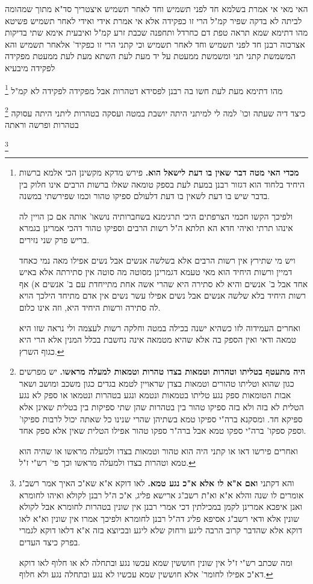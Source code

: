 \documentclass[12pt, openany]{book}
\newcommand{\footnotecomment}[1]{
	\renewcommand\thefootnote{}
	\footnote{#1}}
\newcommand{\commenta}[1]{\footnotecomment{#1}}
\begin{document}
{האי מאי אי אמרת בשלמא חד לפני תשמיש וחד לאחר תשמיש איצטריך סד"א מתוך שמהומה לביתה לא בדקה שפיר קמ"ל הרי זו כפקידה אלא אי אמרת אידי ואידי לאחר תשמיש פשיטא 
מהו דתימא שמא תראה טפת דם כחרדל ותחפנה שכבת זרע קמ"ל 
ואיבעית אימא שתי בדיקות אצרכוה רבנן חד לפני תשמיש וחד לאחר תשמיש וכי קתני הרי זו כפקיד' אלאחר תשמיש והא המשמשת קתני תני ומשמשת
ממעטת על יד מעת לעת השתא מעת לעת ממעטת
מפקידה לפקידה מיבעיא 
\commenta{\textbf{מכדי האי מטה דבר שאין בו דעת לישאל הוא.} פירש מדקא מקשינן הכי אלמא ברשות היחיד בלחוד הוא דגזור רבנן במעת לעת בספק טומאה שאלו ברשות הרבים אינו חלוק בין בדבר שיש בו דעת לשאין בו דעת דלעולם ספיקו טהור וכמו שפירשתי במשנה.\par ולפיכך הקשו חכמי הצרפתים היכי תרגימנא בשחברותיה נושאו' אותה אם כן הויין לה אינהו תרתי ואיהי חדא הא תלתא ה"ל רשות הרבים וספיקו טהור דהכי אמרינן בגמרא בריש פרק שני נזירים.\par ויש מי שתירץ אין רשות הרבים אלא בשלשה אנשים אבל נשים אפילו מאה נמי כאחד דמיין ורשות היחיד הוא מאי טעמא דגמרינן מסוטה מה סוטה אין סתירתה אלא באיש אחד אבל ב' אנשים והיא לא סתירה היא שהרי אשה אחת מתייחדת עם ב' אנשים א) אף רשות היחיד בלא שלשה אנשים אבל נשים אפילו עשר נשים אין אדם מתיחד הילכך הויא לה סתירה ורשות היחיד היא, וזה אינו כלום.\par ואחרים העמידוה לזו כשהיא ישנה בכילה במטה וחלקה רשות לעצמה ולי נראה שזו היא טמאה ודאי ואין הספק בה אלא שהיא מטמאה אינה נחשבת בכלל המנין אלא הרי היא כגוף השרץ. }
מהו דתימא מעת לעת חשו בה רבנן לפסידא דטהרות אבל מפקידה לפקידה לא קמ"ל
\commenta{\textbf{היה מתעטף בטליתו וטהרות וטמאות בצדו טהרות וטמאות למעלה מראשו.} יש מפרשים כגון שהוא וטליתו טהורים וטמאות בצדן שראויין לטמא בגדים כגון משכב ומושב ושאר אבות הטומאות ספק נגע טליתו בטמאות ונטמא ונגע בטהרות ונטמאו או ספק לא נגע הטלית לא בזה ולא בזה ספיקו טהור בין בטהרות שהן שתי ספיקות בין בטלית שאינן אלא ספיקא חד. ומסקנא ברה"י ספיקו טמא בשתיהן שהרי שנינו כל שאתה יכול לרבות ספיקו' וספק ספקו' ברה"י ספקו טמא אבל ברה"ר ספקו טהור אפילו הטלית שאין אלא ספק אחד.\par ואחרים פירשו דאו או קתני היה הוא טהור וטמאות בצדו ולמעלה מראשו או שהיה הוא טמא וטהרות בצדו ולמעלה מראשו וכך פי' רש"י ז"ל. }
כיצד דיה שעתה וכו' למה לי למיתני היתה יושבת במטה ועסקה בטהרות ליתני היתה עסוקה בטהרות ופרשה וראתה 
\commenta{והא דקתני \textbf{ואם א"א לו אלא א"כ נגע טמא.} לאו דוקא א"א שא"כ האיך אמר רשב"ג אומרים לו שנה והלא א"א וא"ת רשב"ג ארישא פליג, א"כ ה"ל רבנן לקולא ואיהו לחומרא ואנן איפכא אמרינן לקמן במכילתין דכי אמרי רבנן אין שונין בטהרות לחומרא אבל לקולא שונין אלא ודאי רשב"ג אסיפא פליג דה"ל רבנן לחומרא ולפיכך אמרו אין שונין וא"א לאו דוקא אלא שהדבר קרוב הרבה ליגע ורחוק שלא ליגע ובכיוצא בזה א"א דלאו דוקא לגמרי בפרק כיצד העדים.\par ומה שכתב רש"י ז"ל אין שונין חוששין שמא עכשו נגע ובתחלה לא או חלוף לאו דוקא דא"כ אפילו לחומר' אלא חוששין שמא עכשיו לא נגע ובתחלה נגע ולא חלוף. }
}
\end{document}
